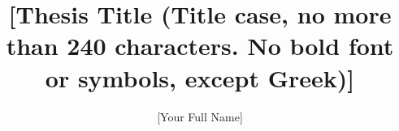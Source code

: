 \documentclass{ucalgarythesis}
\theoremstyle{plain}
\theoremstyle{definition}
\begin{document}


  \title{
   [Thesis Title (Title case, no more than 240 characters. No bold font or symbols, except Greek)]
   \\ 
   }
   
  \author{[Your Full Name]}

  \frontmatter           %
  \makethesistitle       %


\end{document}

